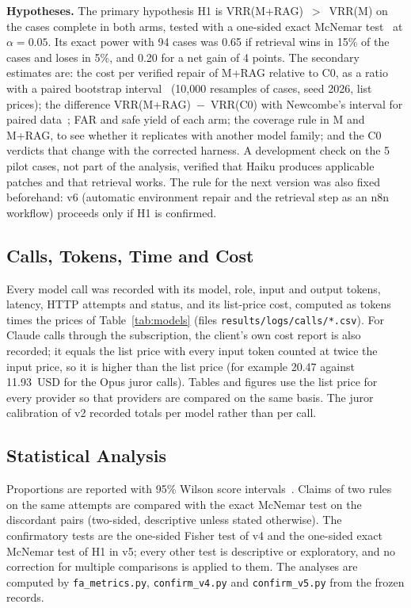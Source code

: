 \documentclass[ai,article,submit,oneauthor]{Definitions/mdpi}
\begin{document}
\textbf{Hypotheses.} The primary hypothesis H1 is VRR(M+RAG)~$>$~VRR(M) on the cases complete in both arms, tested with a one-sided exact McNemar test~\cite{McNemar1947NoteOnThe} at $\alpha=0.05$. Its exact power with 94 cases was 0.65 if retrieval wins in 15\% of the cases and loses in 5\%, and 0.20 for a net gain of 4 points. The secondary estimates are: the cost per verified repair of M+RAG relative to C0, as a ratio with a paired bootstrap interval~\cite{Efron1979BootstrapMethods} (10,000 resamples of cases, seed 2026, list prices); the difference VRR(M+RAG)~$-$~VRR(C0) with Newcombe's interval for paired data~\cite{Newcombe1998ImprovedConfidenceIntervals}; FAR and safe yield of each arm; the coverage rule in M and M+RAG, to see whether it replicates with another model family; and the C0 verdicts that change with the corrected harness. A development check on the 5 pilot cases, not part of the analysis, verified that Haiku produces applicable patches and that retrieval works. The rule for the next version was also fixed beforehand: v6 (automatic environment repair and the retrieval step as an n8n workflow) proceeds only if H1 is confirmed.

\subsection{Calls, Tokens, Time and Cost}\label{sec:cost}

Every model call was recorded with its model, role, input and output tokens, latency, HTTP attempts and status, and its list-price cost, computed as tokens times the prices of Table~\ref{tab:models} (files \texttt{results/logs/calls/*.csv}). For Claude calls through the subscription, the client's own cost report is also recorded; it equals the list price with every input token counted at twice the input price, so it is higher than the list price (for example 20.47 against 11.93~USD for the Opus juror calls). Tables and figures use the list price for every provider so that providers are compared on the same basis. The juror calibration of v2 recorded totals per model rather than per call.

\subsection{Statistical Analysis}\label{sec:stats}

Proportions are reported with 95\% Wilson score intervals~\cite{Wilson1927ProbableInferenceLaw,Brown2001IntervalEstimationFor}. Claims of two rules on the same attempts are compared with the exact McNemar test on the discordant pairs (two-sided, descriptive unless stated otherwise). The confirmatory tests are the one-sided Fisher test of v4 and the one-sided exact McNemar test of H1 in v5; every other test is descriptive or exploratory, and no correction for multiple comparisons is applied to them. The analyses are computed by \texttt{fa\_metrics.py}, \texttt{confirm\_v4.py} and \texttt{confirm\_v5.py} from the frozen records.
\end{document}
